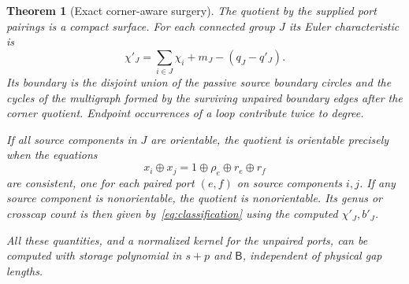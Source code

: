 \documentclass[11pt]{article}
\newtheorem{theorem}{Theorem}[section]
\theoremstyle{definition}
\theoremstyle{remark}\newtheorem{remark}[theorem]{Remark}
\newcommand{\bits}{\mathsf B}
\begin{document}
\begin{theorem}[Exact corner-aware surgery]\label{thm:glue}
The quotient by the supplied port pairings is a compact surface. For each connected group $J$ its Euler characteristic is
\begin{equation}\label{eq:main}
 \boxed{\displaystyle
       \chi'_J=\sum_{i\in J}\chi_i+m_J-(q_J-q'_J).}
\end{equation}
Its boundary is the disjoint union of the passive source boundary circles and the cycles of the multigraph formed by the surviving unpaired boundary edges after the corner quotient. Endpoint occurrences of a loop contribute twice to degree.

If all source components in $J$ are orientable, the quotient is orientable precisely when the equations
\begin{equation}\label{eq:orientation}
 x_i\oplus x_j=1\oplus\rho_e\oplus r_e\oplus r_f
\end{equation}
are consistent, one for each paired port $(e,f)$ on source components $i,j$. If any source component is nonorientable, the quotient is nonorientable. Its genus or crosscap count is then given by~\eqref{eq:classification} using the computed $\chi'_J,b'_J$.

All these quantities, and a normalized kernel for the unpaired ports, can be computed with storage polynomial in $s+p$ and $\bits$, independent of physical gap lengths.
\end{theorem}
\end{document}
